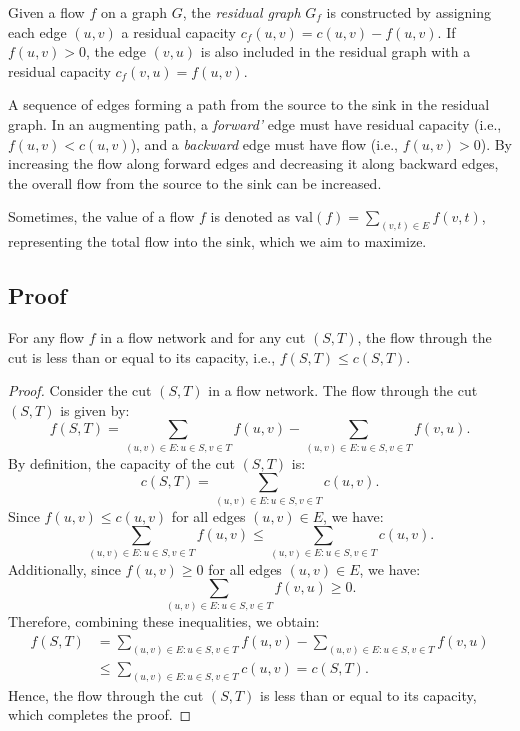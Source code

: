 \begin{definition}
    Given a flow \( f \) on a graph \( G \), the \emph{residual graph} \( G_f \) is constructed by assigning each edge \( (u, v) \) a residual capacity \( c_f(u, v) = c(u, v) - f(u, v) \). If \( f(u, v) > 0 \), the edge \( (v, u) \) is also included in the residual graph with a residual capacity \( c_f(v, u) = f(u, v) \).
\end{definition}

\begin{definition}
    A sequence of edges forming a path from the source to the sink in the residual graph. In an augmenting path, a \emph{forward'} edge must have residual capacity (i.e., \( f(u, v) < c(u, v) \)), and a \emph{backward} edge must have flow (i.e., \( f(u, v) > 0 \)). By increasing the flow along forward edges and decreasing it along backward edges, the overall flow from the source to the sink can be increased.    
\end{definition}


\noindent Sometimes, the value of a flow \( f \) is denoted as \( \mathrm{val}(f) = \sum_{(v, t) \in E} f(v, t)\), representing the total flow into the sink, which we aim to maximize. 


\subsection{Proof}

\begin{lemma}
    For any flow \( f \) in a flow network and for any cut \( (S, T) \), the flow through the cut is less than or equal to its capacity, i.e., \( f(S, T) \leq c(S, T) \).
\end{lemma}

\begin{proof}
    Consider the cut \( (S, T) \) in a flow network. The flow through the cut \( (S, T) \) is given by:
    \[
    f(S, T) = \sum_{(u, v) \in E : u \in S, v \in T} f(u, v) - \sum_{(u, v)\in E : u \in S, v \in T} f(v, u).
    \]
    By definition, the capacity of the cut \( (S, T) \) is:
    \[
    c(S, T) = \sum_{(u, v) \in E : u \in S, v \in T} c(u, v).
    \]
    Since \( f(u, v) \leq c(u, v) \) for all edges \( (u, v) \in E \), we have:
    \[
    \sum_{(u, v) \in E : u \in S, v \in T} f(u, v) \leq \sum_{(u, v) \in E : u \in S, v \in T} c(u, v).
    \]
    Additionally, since \( f(u, v) \geq 0 \) for all edges \( (u, v) \in E \), we have:
    \[
    \sum_{(u, v) \in E : u \in S, v \in T} f(v, u) \geq 0.
    \]
    Therefore, combining these inequalities, we obtain:
    \begin{align*}
        f(S, T) &= \sum_{(u, v) \in E : u \in S, v \in T} f(u, v) - \sum_{(u, v) \in E : u \in S, v \in T} f(v, u) \\
        &\leq \sum_{(u, v) \in E : u \in S, v \in T} c(u, v) = c(S, T).
    \end{align*}
    Hence, the flow through the cut \( (S, T) \) is less than or equal to its capacity, which completes the proof.
\end{proof}


